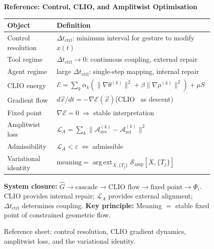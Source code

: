 \documentclass[11pt, a4paper]{article}
\begin{document}
\begin{figure}[H]
\centering
\small
\begin{minipage}{0.95\textwidth}
\textbf{Reference: Control, CLIO, and Amplitwist Optimisation}
\medskip

\begin{tabular}{@{}p{4.0cm}p{9.4cm}@{}}
\toprule
\textbf{Object} & \textbf{Definition} \\
\midrule
Control resolution & $\Delta t_{\mathrm{ctrl}}$: minimum interval for gesture to modify $x(t)$ \\
Tool regime & $\Delta t_{\mathrm{ctrl}}\to 0$: continuous coupling, external repair \\
Agent regime & large $\Delta t_{\mathrm{ctrl}}$: single-step mapping, internal repair \\
CLIO energy & $\mathcal{E}=\sum_k\alpha_k(\|\nabla\theta^{(k)}\|^2+\beta\|\nabla\rho^{(k)}\|^2)+\mu S$ \\
Gradient flow & $d\vec{x}/dt = -\nabla\mathcal{E}(\vec{x})$\quad (CLIO~\cite{cheng2025clio} as descent) \\
Fixed point & $\nabla\mathcal{E}=0\;\Rightarrow\;$stable interpretation \\
Amplitwist loss & $\mathcal{L}_A=\sum_k\|\mathcal{A}^{(k)}_{\mathrm{sys}}-\mathcal{A}^{(k)}_{\mathrm{ref}}\|^2$ \\
Admissibility & $\mathcal{L}_A<\varepsilon\;\Longleftrightarrow\;$admissible \\
Variational identity & $\mathrm{meaning}=\operatorname{arg\,ext}_{X,\{T_j\}}\mathcal{S}_{\mathrm{amp}}[X,\{T_j\}]$ \\
\bottomrule
\end{tabular}

\medskip
\textbf{System closure:}
$\hat{G}\to\text{cascade}\to\text{CLIO flow}\to\text{fixed point}\to\Phi_i$.
CLIO provides internal repair; $\mathcal{L}_A$ provides external alignment;
$\Delta t_{\mathrm{ctrl}}$ determines coupling.
\textbf{Key principle:}
Meaning $=$ stable fixed point of constrained geometric flow.
\end{minipage}
\caption{Reference sheet: control resolution, CLIO gradient dynamics, amplitwist loss,
and the variational identity.}
\label{fig:cheat-control}
\end{figure}
\end{document}
